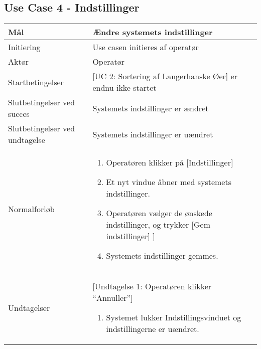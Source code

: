 \subsection{Use Case 4 - Indstillinger}
\begin{center}
		\begin{longtable}{ | m{4cm} | m{8cm}| } 
			\hline
			Mål & Ændre systemets indstillinger \\ 
			\hline
			Initiering &  Use casen initieres af operatør\\
			\hline
			Aktør & Operatør \\ 
			\hline
			Startbetingelser & [UC 2: Sortering af Langerhanske Øer] er endnu ikke startet\\ 
			\hline	
			Slutbetingelser ved succes & Systemets indstillinger er ændret \\
			\hline
			Slutbetingelser ved undtagelse & Systemets indstillinger er uændret \\
			\hline
			Normalforløb & \begin{enumerate}
				\item Operatøren klikker på [Indstillinger]
				\item Et nyt vindue åbner med systemets indstillinger.
				\item Operatøren vælger de ønskede indstillinger, og trykker [Gem indstillinger]
				\subitem [Undtagelse 1: Operatøren klikker [Annuller]]
				\item Systemets indstillinger gemmes.
			\end{enumerate} \\ 
			\hline
			Undtagelser & [Undtagelse 1: Operatøren klikker “Annuller”]
			
			\begin{enumerate}
			\item Systemet lukker Indstillingsvinduet og indstillingerne er uændret.
			\end{enumerate} \\
			\hline
		\end{longtable}
		
	\end{center}
	\pagebreak